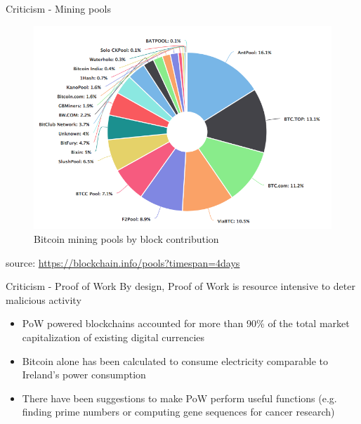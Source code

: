 \documentclass[10pt]{beamer}
\begin{document}
\begin{frame}{Criticism - Mining pools}
	\begin{figure}[]
		\centering
		\includegraphics  [scale=0.35]{Images/pool}
		\caption{Bitcoin mining pools by block contribution}
	\end{figure}
	\begin{scriptsize}
		source: \href{https://blockchain.info/pools?timespan=4days}{https://blockchain.info/pools?timespan=4days}
	\end{scriptsize}
\end{frame}


\begin{frame}{Criticism - Proof of Work}
	By design, Proof of Work is resource intensive to deter malicious activity
	\begin{itemize}
		\item PoW powered blockchains accounted for more than 90\% of the total market capitalization of existing digital currencies
		\item Bitcoin alone has been calculated to consume electricity comparable to Ireland's power consumption
		\item There have been suggestions to make PoW perform useful functions (e.g. finding prime numbers or computing gene sequences for cancer research)
	\end{itemize}
\end{frame}

\end{document}

